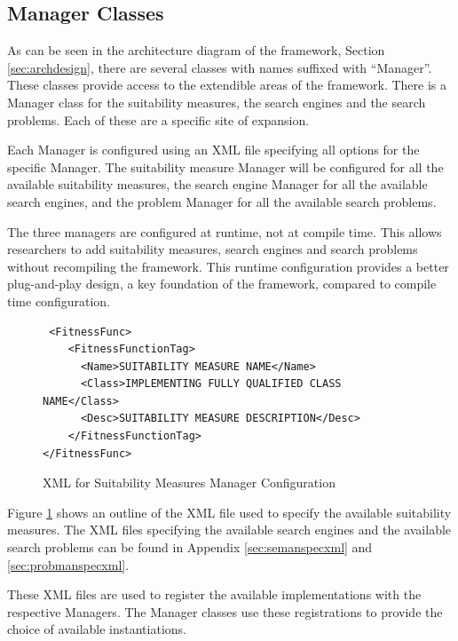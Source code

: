 \subsection{Manager Classes}
\label{sec:manclasses}
As can be seen in the architecture diagram of the framework, Section \ref{sec:archdesign}, there are several classes with names suffixed with ``Manager''.
These classes provide access to the extendible areas of the framework.
There is a Manager class for the suitability measures, the search engines and the search problems.
Each of these are a specific site of expansion.

Each Manager is configured using an XML file specifying all options for the specific Manager.
The suitability measure Manager will be configured for all the available suitability measures, the search engine Manager for all the available search engines, and the problem Manager for all the available search problems.

The three managers are configured at runtime, not at compile time.
This allows researchers to add suitability measures, search engines and search problems without recompiling the framework.
This runtime configuration provides a better plug-and-play design, a key foundation of the framework, compared to compile time configuration.

\lstset{language=XML}
\begin{figure}
\begin{lstlisting}
 <FitnessFunc>
	<FitnessFunctionTag>
	  <Name>SUITABILITY MEASURE NAME</Name>
	  <Class>IMPLEMENTING FULLY QUALIFIED CLASS NAME</Class>
	  <Desc>SUITABILITY MEASURE DESCRIPTION</Desc>
	</FitnessFunctionTag>
</FitnessFunc>
\end{lstlisting}
\caption{XML for Suitability Measures Manager Configuration}
\label{code:fitfuntmanconfig}
\end{figure}

Figure \ref{code:fitfuntmanconfig} shows an outline of the XML file used to specify the available suitability measures.
The XML files specifying the available search engines and the available search problems can be found in Appendix \ref{sec:semanspecxml} and \ref{sec:probmanspecxml}.

These XML files are used to register the available implementations with the respective Managers.
The Manager classes use these registrations to provide the choice of available instantiations.

